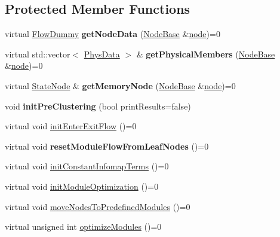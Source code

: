 \subsection*{Protected Member Functions}
\begin{DoxyCompactItemize}
\item 
\mbox{\label{classInfomapBase_aadb6aafc394421ab1061880d903edb67}} 
virtual \mbox{\hyperlink{structFlowDummy}{Flow\+Dummy}} {\bfseries get\+Node\+Data} (\mbox{\hyperlink{classNodeBase}{Node\+Base}} \&\mbox{\hyperlink{structnode}{node}})=0
\item 
\mbox{\label{classInfomapBase_a3b07335e7bdce0858a15b009d9265db6}} 
virtual std\+::vector$<$ \mbox{\hyperlink{structPhysData}{Phys\+Data}} $>$ \& {\bfseries get\+Physical\+Members} (\mbox{\hyperlink{classNodeBase}{Node\+Base}} \&\mbox{\hyperlink{structnode}{node}})=0
\item 
\mbox{\label{classInfomapBase_add32bae3484c40b5613fcdac33c1ba7a}} 
virtual \mbox{\hyperlink{structStateNode}{State\+Node}} \& {\bfseries get\+Memory\+Node} (\mbox{\hyperlink{classNodeBase}{Node\+Base}} \&\mbox{\hyperlink{structnode}{node}})=0
\item 
\mbox{\label{classInfomapBase_a13278a18743abf7336ceef12965b1cf7}} 
void {\bfseries init\+Pre\+Clustering} (bool print\+Results=false)
\item 
virtual void \mbox{\hyperlink{classInfomapBase_a689210ed8f0eaeb767dc1321dfec65f5}{init\+Enter\+Exit\+Flow}} ()=0
\item 
\mbox{\label{classInfomapBase_a0f3b1bbb40d79b006dffc762433dfad1}} 
virtual void {\bfseries reset\+Module\+Flow\+From\+Leaf\+Nodes} ()=0
\item 
virtual void \mbox{\hyperlink{classInfomapBase_a093ad5e840cb4529ac32eaf4f9d6d8b2}{init\+Constant\+Infomap\+Terms}} ()=0
\item 
virtual void \mbox{\hyperlink{classInfomapBase_a8347fea5ed1cd22a27c7d972496e7d90}{init\+Module\+Optimization}} ()=0
\item 
virtual void \mbox{\hyperlink{classInfomapBase_ab085f56e93df121d113b5869a51824c9}{move\+Nodes\+To\+Predefined\+Modules}} ()=0
\item 
virtual unsigned int \mbox{\hyperlink{classInfomapBase_a443a496b76cc78286cce345e018c4fd8}{optimize\+Modules}} ()=0

\end{DoxyCompactItemize}

